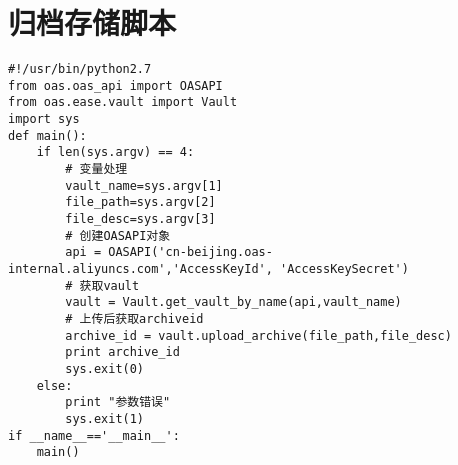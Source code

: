 \chapter{归档存储脚本}
\label{cha:aliyun-oas}
\begin{lstlisting}[numbers=none]
#!/usr/bin/python2.7
from oas.oas_api import OASAPI
from oas.ease.vault import Vault
import sys
def main():
    if len(sys.argv) == 4:
        # 变量处理
        vault_name=sys.argv[1]
        file_path=sys.argv[2]
        file_desc=sys.argv[3]
        # 创建OASAPI对象
        api = OASAPI('cn-beijing.oas-internal.aliyuncs.com','AccessKeyId', 'AccessKeySecret')
        # 获取vault
        vault = Vault.get_vault_by_name(api,vault_name)
        # 上传后获取archiveid
        archive_id = vault.upload_archive(file_path,file_desc)
        print archive_id
        sys.exit(0)
    else:
        print "参数错误"
        sys.exit(1)
if __name__=='__main__':
    main()
\end{lstlisting}